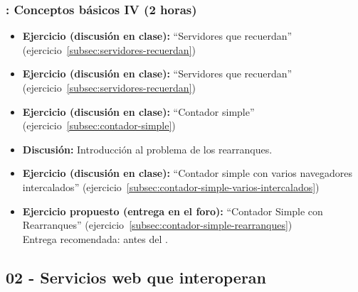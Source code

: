 \documentclass[a4paper,12pt]{article}
\begin{document}
\subsubsection{\martesD: Conceptos básicos IV (2 horas)}
\label{cal:martesD}

\begin{itemize}
\item \textbf{Ejercicio (discusión en clase):} ``Servidores que recuerdan'' (ejercicio~\ref{subsec:servidores-recuerdan})
\item \textbf{Ejercicio (discusión en clase):} ``Servidores que recuerdan'' (ejercicio~\ref{subsec:servidores-recuerdan}) 
\item \textbf{Ejercicio (discusión en clase):} ``Contador simple'' (ejercicio~\ref{subsec:contador-simple})
\item \textbf{Discusión:} Introducción al problema de los rearranques.
\item \textbf{Ejercicio (discusión en clase):} ``Contador simple con varios navegadores intercalados'' (ejercicio~\ref{subsec:contador-simple-varios-intercalados})
\item \textbf{Ejercicio propuesto (entrega en el foro):} ``Contador Simple con Rearranques'' (ejercicio~\ref{subsec:contador-simple-rearranques})
 \\
  Entrega recomendada: antes del \martesE.
\end{itemize}

%
%

\subsection{02 - Servicios web que interoperan}
\end{document}
